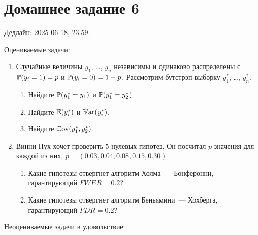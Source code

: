 

\section*{Домашнее задание 6}

Дедлайн: 2025-06-18, 23:59.

Оцениваемые задачи:

\begin{enumerate}
\item Случайные величины $y_1$, \dots, $y_n$ независимы и одинаково распределены с $\P(y_i = 1) = p$ и $\P(y_i = 0) = 1 - p$. 
Рассмотрим бутстрэп-выборку $y_1^*$, \dots, $y_n^*$.
\begin{enumerate}
    \item Найдите $\P(y_1^* = y_1)$ и $\P(y_1^* = y_2^*)$.
    \item Найдите $\E(y_i^*)$ и $\Var(y_i^*)$.
    \item Найдите $\Cov(y_1^*, y_2^*)$.
\end{enumerate}

\item Винни-Пух хочет проверить $5$ нулевых гипотез. 
Он посчитал $p$-значения для каждой из них, $p = (0.03, 0.04, 0.08, 0.15, 0.30)$.
\begin{enumerate}
    \item Какие гипотезы отвергнет алгоритм Холма~— Бонферонни, гарантирующий $FWER = 0.2$?
    \item Какие гипотезы отвергнет алгоритм Беньямини~— Хохберга, гарантирующий $FDR = 0.2$?
\end{enumerate}
     

\end{enumerate}

Неоцениваемые задачи в удовольствие:

